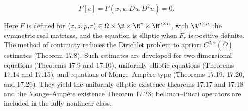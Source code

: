 \begin{equation}\label{gt.eq1.11}
F[u] = F(x,u,Du,D^2u) = 0.
\end{equation}

Here $F$ is defined for
$(x,z,p,r)\in\Omega\times\R\times\R^n\times\R^{n\times n}$, with
$\R^{n\times n}$ the symmetric real matrices, and the equation is elliptic when
$F_r$ is positive definite. The method of continuity reduces the Dirichlet
problem to apriori $C^{2,\alpha}(\overline\Omega)$ estimates (Theorem 17.8).
Such estimates are developed for two-dimensional equations (Theorems 17.9 and
17.10), uniformly elliptic equations (Theorems 17.14 and 17.15), and equations
of Monge--Amp\`ere type (Theorems 17.19, 17.20, and 17.26). They yield the
uniformly elliptic existence theorems 17.17 and 17.18 and the Monge--Amp\`ere
existence Theorem 17.23; Bellman--Pucci operators are included in the fully
nonlinear class.

\bigskip

